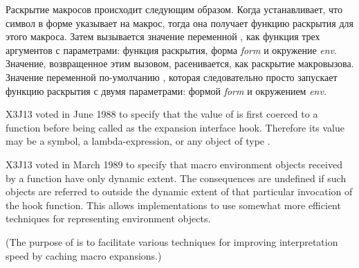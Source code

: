 \begin{defun}[Function]
Раскрытие макросов происходит следующим образом. Когда 
устанавливает, что символ в форме указывает на макрос, тогда она получает
функцию раскрытия для этого макроса. Затем вызывается значение переменной
, как функция трех аргументов с параметрами:
функция раскрытия,
форма \emph{form} и
окружение \emph{env}.
Значение, возвращенное этим вызовом, расенивается, как раскрытие макровызова.
Значение переменной  по-умолчанию , которая
следовательно просто запускает функцию раскрытия с двумя параметрами: формой
\emph{form} и окружением \emph{env}.

\begin{newer}
X3J13 voted in June 1988  to specify
that the value of  is first coerced to a
function before being called as the expansion interface hook.
Therefore its value may be a symbol, a lambda-expression, or any
object of type .
\end{newer}

\begin{newer}
X3J13 voted in March 1989 
to specify that macro environment objects received
by a  function
have only dynamic extent.  The consequences are undefined if such objects are
referred to outside the dynamic extent of that particular invocation of the hook
function.  This allows implementations to use somewhat more efficient techniques
for representing environment objects. 
\end{newer}

\begin{obsolete}
(The purpose of
 is to facilitate various techniques
for improving interpretation speed by caching macro expansions.)
\end{obsolete}


\end{defun}
